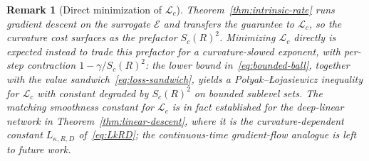\documentclass[letterpaper]{article}
\newtheorem{remark}[theorem]{Remark}
\begin{document}
\begin{remark}[Direct minimization of $\mathcal L_c$]
\label{rem:direct-intrinsic}
Theorem~\ref{thm:intrinsic-rate} runs gradient descent on the surrogate
$\mathcal E$ and transfers the guarantee to $\mathcal L_c$, so the curvature
cost surfaces as the prefactor $S_c(R)^2$. Minimizing $\mathcal L_c$ directly
is expected instead to trade this prefactor for a curvature-slowed exponent,
with per-step contraction $1-\gamma/S_c(R)^2$: the lower bound
in~\eqref{eq:bounded-ball}, together with the value
sandwich~\eqref{eq:loss-sandwich}, yields a Polyak--\L ojasiewicz inequality
for $\mathcal L_c$ with constant degraded by $S_c(R)^2$ on bounded sublevel
sets. The matching smoothness constant for $\mathcal L_c$ is in fact established
for the deep-linear network in Theorem~\ref{thm:linear-descent}, where it is
the curvature-dependent constant $L_{\kappa,R,D}$ of~\eqref{eq:LkRD}; the
continuous-time gradient-flow analogue is left to future work.
\end{remark}
\end{document}
